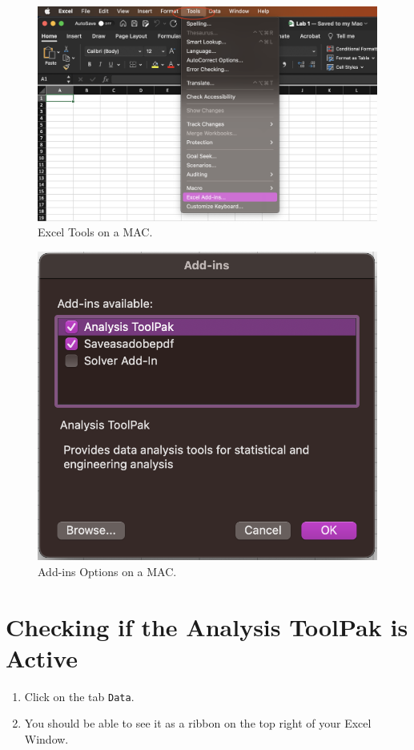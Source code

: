 \documentclass[
]{book}
\providecommand{\tightlist}{%
  \setlength{\itemsep}{0pt}\setlength{\parskip}{0pt}}
\begin{document}
\begin{figure}

{\centering \includegraphics[width=0.75\linewidth]{toolpak_mac1} 

}

\caption{Excel Tools on a MAC.}\label{fig:analysis-toolpak-mac1}
\end{figure}
\begin{figure}

{\centering \includegraphics[width=0.4\linewidth]{toolpak_mac2} 

}

\caption{Add-ins Options on a MAC.}\label{fig:analysis-toolpak-mac2}
\end{figure}

\hypertarget{checking-if-the-analysis-toolpak-is-active}{%
\section{Checking if the Analysis ToolPak is Active}\label{checking-if-the-analysis-toolpak-is-active}}

\begin{enumerate}
\def\labelenumi{\arabic{enumi}.}
\tightlist
\item
  Click on the tab \texttt{Data}.
\item
  You should be able to see it as a ribbon on the top right of your Excel Window.
\end{enumerate}
\end{document}
